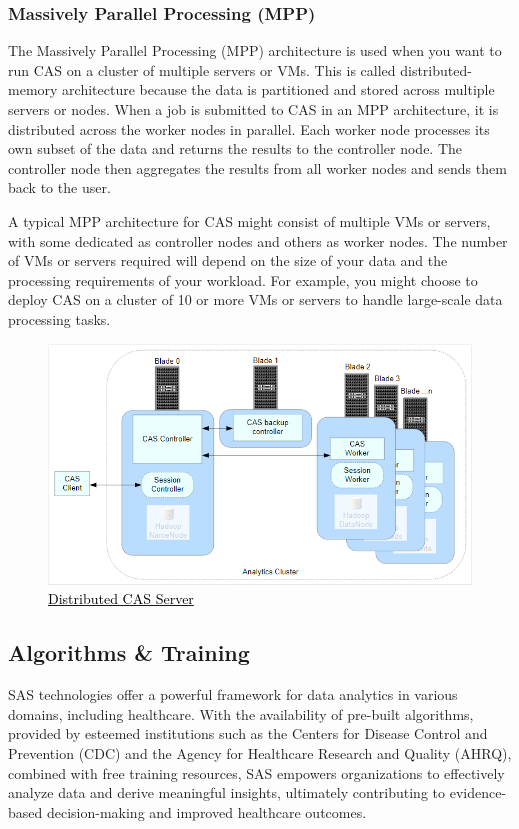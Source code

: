 \subsubsection{Massively Parallel Processing (MPP)}
The Massively Parallel Processing (MPP) architecture is used when you want to run CAS on a cluster of multiple servers or VMs. This is called distributed-memory architecture because the data is partitioned and stored across multiple servers or nodes. When a job is submitted to CAS in an MPP architecture, it is distributed across the worker nodes in parallel. Each worker node processes its own subset of the data and returns the results to the controller node. The controller node then aggregates the results from all worker nodes and sends them back to the user.

A typical MPP architecture for CAS might consist of multiple VMs or servers, with some dedicated as controller nodes and others as worker nodes. The number of VMs or servers required will depend on the size of your data and the processing requirements of your workload. For example, you might choose to deploy CAS on a cluster of 10 or more VMs or servers to handle large-scale data processing tasks.

\begin{figure}[H]
    \centering
    \includegraphics[scale = 0.70]{images/mpp_server.png}
    \caption{\href{https://documentation.sas.com/doc/en/calcdc/3.3/calserverscas/n05000viyaservers000000admin.htm}{\textcolor{black}{Distributed CAS Server}}}
    \label{MMP Architecture}
\end{figure}

\subsection{Algorithms \& Training}
SAS technologies offer a powerful framework for data analytics in various domains, including healthcare. With the availability of pre-built algorithms, provided by esteemed institutions such as the Centers for Disease Control and Prevention (CDC) and the Agency for Healthcare Research and Quality (AHRQ), combined with free training resources, SAS empowers organizations to effectively analyze data and derive meaningful insights, ultimately contributing to evidence-based decision-making and improved healthcare outcomes.

